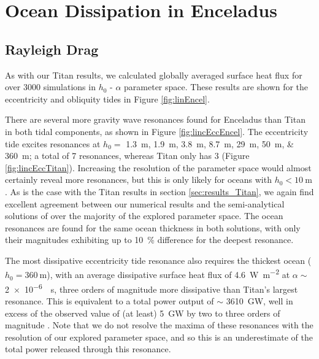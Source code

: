 
\section{Ocean Dissipation in Enceladus \label{sec:results_Enceladus}}

\subsection{Rayleigh Drag} \label{sec:ray_enc}



As with our Titan results, we calculated globally averaged surface heat flux for over 3000 simulations in $h_0$ - $\alpha$ parameter space. These results are shown for the eccentricity and obliquity tides in Figure \ref{fig:linEncel}.

There are several more gravity wave resonances found for Enceladus than Titan in both tidal components, as shown in Figure \ref{fig:lincEccEncel}. The eccentricity tide excites resonances at $h_0 =$ \SIlist{1.3;1.9;3.8;8.7;29;50;360}{m}; a total of 7 resonances, whereas Titan only has 3 (Figure \ref{fig:lincEccTitan}). Increasing the resolution of the parameter space would almost certainly reveal more resonances, but this is only likely for oceans with $h_0 < \SI{10}{\metre}$. As is the case with the Titan results in section \ref{sec:results_Titan}, we again find excellent agreement between our numerical results and the semi-analytical solutions of \citet{matsuyama2014tidal} over the majority of the explored parameter space. The ocean resonances are found for the same ocean thickness in both solutions, with only their magnitudes exhibiting up to \SI{10}{\percent} difference for the deepest resonance.



The most dissipative eccentricity tide resonance also requires the thickest ocean ($h_0 = \SI{360}{\metre}$), with an average dissipative surface heat flux of \SI{4.6}{\watt\per\square\metre} at $\alpha\sim$ \SI{2e-6}{\per\second}, three orders of magnitude more dissipative than Titan's largest resonance. This is equivalent to a total power output of $\sim$ \SI{3610}{\giga\watt}, well in excess of the observed value of (at least) \SI{5}{\giga\watt} by two to three orders of magnitude \citep{spencer2006cassini,howett2011high, spencer2013new}. Note that we do not resolve the maxima of these resonances with the resolution of our explored parameter space, and so this is an underestimate of the total power released through this resonance.

